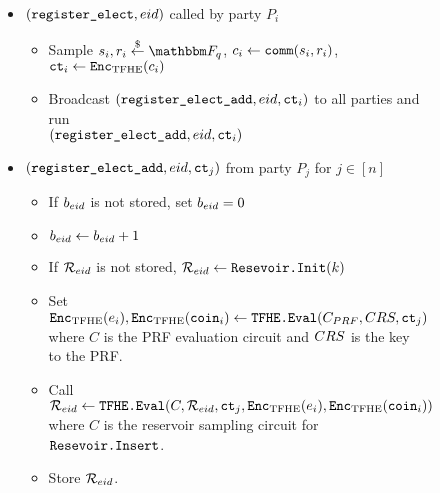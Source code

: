 \begin{figure}[H]
{\begin{minipage}{1\textwidth}
			\begin{itemize}
				\item $(\texttt{register\_elect}, {eid})$ called by party $P_i$
				      \begin{itemize}
					      \item Sample $s_i, r_i \randomGet \F_q$, $c_i \gets \texttt{comm}(s_i, r_i)$, $\texttt{ct}_i \gets \texttt{Enc}_{\mathrm{TFHE}}(c_i)$
					      \item Broadcast $(\texttt{register\_elect\_add}, {eid}, \texttt{ct}_i)$ to all parties and run \\$(\texttt{register\_elect\_add}, {eid}, \texttt{ct}_i)$
				      \end{itemize}
				\item $(\texttt{register\_elect\_add}, {eid}, \texttt{ct}_j)$ from party $P_j$ for $j \in [n]$
				      \begin{itemize}
					      \item If $b_{eid}$ is not stored, set $b_{eid} = 0$
					      \item $b_{eid} \gets b_{eid}+1$
					      \item If $\mathcal{R}_{eid}$ is not stored, $\mathcal{R}_{eid} \gets \texttt{Resevoir.Init}(k)$
					      \item Set $\texttt{Enc}_{\mathrm{TFHE}}(e_i), \texttt{Enc}_{\mathrm{TFHE}}(\texttt{coin}_i) \gets \texttt{TFHE.Eval}(C_{PRF}, CRS, \texttt{ct}_j)$
					            where $C$ is the PRF evaluation circuit and $CRS$ is the key to the PRF. 
					      \item Call $\mathcal{R}_{eid} \gets \texttt{TFHE.Eval}(C, \mathcal{R}_{eid}, \texttt{ct}_j, \texttt{Enc}_{\mathrm{TFHE}}(e_i), \texttt{Enc}_{\mathrm{TFHE}}(\texttt{coin}_i))$ where
					            $C$ is the reservoir sampling circuit for $\texttt{Resevoir.Insert}$. %
					      \item Store $\mathcal{R}_{eid}$.
				      \end{itemize}


\end{itemize}
\end{minipage}}
\end{figure}
